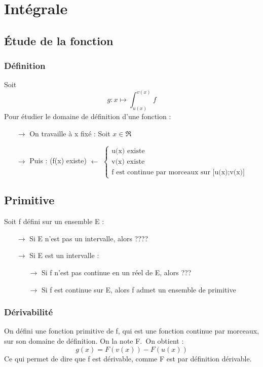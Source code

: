 \documentclass[a4paper,12 pt,oneside]{report}     %
\begin{document}
\chapter{Intégrale}
\section{Étude de la fonction}
\subsection{Définition}
Soit $$g: x\mapsto \int_{u(x)}^{v(x)} f$$
Pour étudier le domaine de définition d'une fonction :
\begin{itemize}
 \item[{$\rightarrow$}] On travaille à x fixé : Soit $x \in \Re$
 \item[{$\rightarrow$}] Puis : (f(x) existe) $\leftarrow$
$\left\{\begin{array}{l}
   \mbox{u(x) existe}\\
   \mbox{v(x) existe} \\
   \mbox{f est continue par morceaux sur [u(x);v(x)]}
  \end{array}\right. $
\end{itemize}
\section{Primitive}
Soit f défini sur un ensemble E : 
\begin{itemize}
 \item[$\rightarrow$] Si E n'est pas un intervalle, alors ????
 \item[$\rightarrow$] Si E est un intervalle : \begin{itemize}
 \item[$\rightarrow$]Si f n'est pas continue en un réel de E, alors ???
 \item[$\rightarrow$]Si f est continue sur E, alors f admet un ensemble de primitive

\end{itemize}


\end{itemize}

\subsection{Dérivabilité}
On défini une fonction primitive de f, qui est une fonction continue par morceaux, sur son domaine de définition. On la note F.\ On obtient :
$$g(x) = F(v(x)) - F(u(x))$$
Ce qui permet de dire que f est dérivable, comme F est par définition dérivable.
\end{document}

